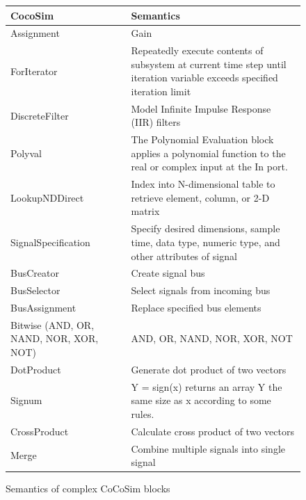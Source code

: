 \documentclass{article}
\begin{document}
\begin{figure}[t]
\centering
{
\begin{tabular}{lp{6cm}}
\hline
\textbf{CocoSim} & \textbf{Semantics}  \\
\hline

Assignment &
Gain
\\

ForIterator &
Repeatedly execute contents of subsystem at current time step until iteration variable exceeds specified iteration limit
\\

DiscreteFilter &
Model Infinite Impulse Response (IIR) filters
\\

Polyval &
The Polynomial Evaluation block applies a polynomial function to the real or complex input at the In port.
\\

LookupNDDirect &
Index into N-dimensional table to retrieve element, column, or 2-D matrix
\\

SignalSpecification &
Specify desired dimensions, sample time, data type, numeric type, and other attributes of signal
\\

BusCreator &
Create signal bus
\\

BusSelector &
Select signals from incoming bus
\\

BusAssignment &
Replace specified bus elements
\\

Bitwise (AND, OR, NAND, NOR, XOR, NOT) &
AND, OR, NAND, NOR, XOR, NOT
\\

DotProduct &
Generate dot product of two vectors
\\

Signum &
Y = sign(x) returns an array Y the same size as x according to some rules.
\\

CrossProduct &
Calculate cross product of two vectors
\\

Merge &
Combine multiple signals into single signal
\\

\hline
\end{tabular}
}
\caption{Semantics of complex CoCoSim blocks}
\label{mapping4}
\end{figure}
\end{document}
